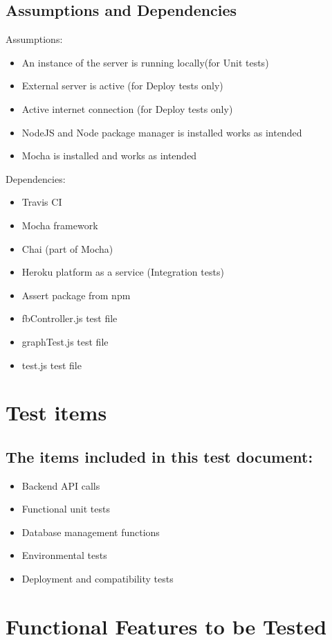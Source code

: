 \documentclass{article}
\begin{document}
\subsection{Assumptions and Dependencies}\label{subsec:assumptions}
Assumptions:
\begin{itemize}
	\item An instance of the server is running locally(for Unit tests)
	\item External server is active (for Deploy tests only)
	\item Active internet connection (for Deploy tests only)
	\item NodeJS and Node package manager is installed works as intended
	\item Mocha is installed and works as intended
\end{itemize}
Dependencies:
\begin{itemize}
	\item Travis CI 
	\item Mocha framework
	\item Chai (part of Mocha)
	\item Heroku platform as a service (Integration tests)
	\item Assert package from npm
	\item fbController.js test file
	\item graphTest.js test file
	\item test.js test file
\end{itemize}


\section{Test items}\label{sec:testItems}
\subsection{The items included in this test document:}
\begin{itemize}
	\item Backend API calls
	\item Functional unit tests
	\item Database management functions
	\item Environmental tests 
	\item Deployment and compatibility tests
\end{itemize} 

\pagebreak
\section{Functional Features to be Tested}\label{sec:FeaturesTest}
\end{document}
